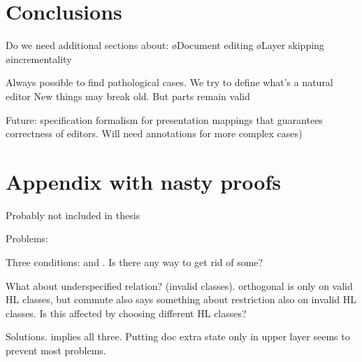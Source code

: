 %																
%																
%																
%
%
%


%																
%																
%																
%
%

\section{Conclusions}

Do we need additional sections about:
\bl
\o Document editing
\o Layer skipping
\o incrementality
\el

Always possible to find pathological cases.
We try to define what's a natural editor
New things may break old. But parts remain valid

Future: specification formalism for presentation mappings that guarantees correctness of editors. Will need annotations for more complex cases)

\pagebreak
\section{Appendix with nasty proofs}

Probably not included in thesis

Problems:


Three conditions:   and . Is there any way to get rid of some?

What about underspecified relation? (invalid classes). orthogonal is only on valid HL classes, but commute also says something about  restriction also on invalid HL classes. Is this affected by choosing different HL classes?

Solutions.
 implies all three. Putting doc extra state only in upper layer seems to prevent most problems.

